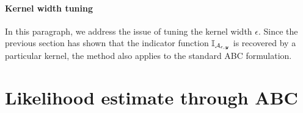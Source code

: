\paragraph{Kernel width tuning}
In this paragraph, we address the issue of tuning the kernel width $\epsilon$. Since the previous section has shown that the indicator function $\mathbb{I}_{\mathcal{A}_{\epsilon, \bm{y}}}$ is recovered by a particular kernel, the method also applies to the standard ABC formulation.


\section{Likelihood estimate through ABC} \label{sec:abcmh}